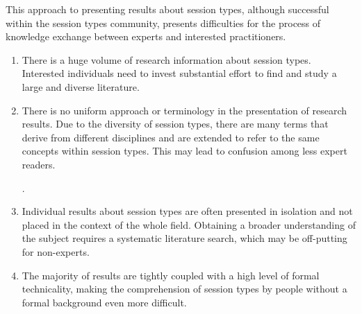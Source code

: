 
This approach to presenting results about session types, although successful within the session types community,
presents difficulties for the process of knowledge exchange between experts and interested practitioners.

%
\begin{enumerate}
	\item	There is a huge volume of research information about session types.
			Interested individuals need to invest substantial effort to find
			and study a large and diverse literature.

	\item	There is no uniform approach or terminology
			in the presentation of research results.
			Due to the diversity of session types,
			there are many terms that derive from different
			disciplines and are extended to refer to
			the same concepts within session types.
			This may lead to confusion among less
			expert readers.

			.

	\item	Individual results about session types are often presented in
			isolation and not placed in the context of the whole field. Obtaining a broader understanding of the subject requires a systematic literature search, which may be off-putting for non-experts.
			


	\item	The majority of results are tightly coupled
			with a high level of formal technicality, making the
			comprehension of session types by people without
			a formal background even more difficult.
\end{enumerate}
